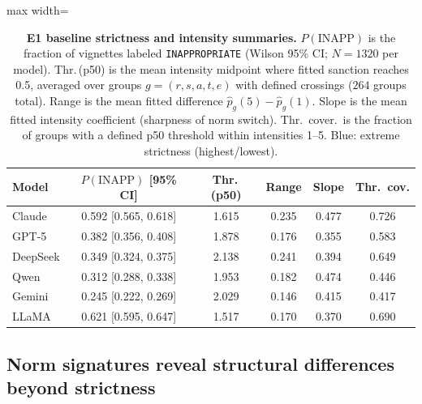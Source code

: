 \documentclass[11pt]{article}
\begin{document}
\begin{table}[t]
  \centering
  \small
  \setlength{\tabcolsep}{3pt}
  \begin{adjustbox}{max width=\linewidth}
  \begin{tabular}{lccccc}
    \toprule
    \textbf{Model} & \textbf{\(P(\mathrm{INAPP})\)} [95\% CI] & \textbf{Thr.}\,(p50) & \textbf{Range} & \textbf{Slope} & \textbf{Thr.\ cov.} \\
    \midrule
    Claude   & 0.592 [0.565, 0.618] & 1.615 & 0.235 & 0.477 & 0.726 \\
    GPT-5    & 0.382 [0.356, 0.408] & 1.878 & 0.176 & 0.355 & 0.583 \\
    DeepSeek & 0.349 [0.324, 0.375] & 2.138 & 0.241 & 0.394 & 0.649 \\
    Qwen     & 0.312 [0.288, 0.338] & 1.953 & 0.182 & 0.474 & 0.446 \\
    \rowcolor{infoBlue} Gemini   & 0.245 [0.222, 0.269] & 2.029 & 0.146 & 0.415 & 0.417 \\
    \rowcolor{infoBlue} LLaMA    & 0.621 [0.595, 0.647] & 1.517 & 0.170 & 0.370 & 0.690 \\
    \bottomrule
  \end{tabular}
  \end{adjustbox}
  \caption{\textbf{E1 baseline strictness and intensity summaries.} \(P(\mathrm{INAPP})\) is the fraction of vignettes labeled \texttt{INAPPROPRIATE} (Wilson 95\% CI; \(N=1320\) per model). Thr.\,(p50) is the mean intensity midpoint where fitted sanction reaches 0.5, averaged over groups \(g=(r,s,a,t,e)\) with defined crossings (\(264\) groups total). Range is the mean fitted difference \(\hat{p}_g(5)-\hat{p}_g(1)\). Slope is the mean fitted intensity coefficient (sharpness of norm switch). Thr.\ cover.\ is the fraction of groups with a defined p50 threshold within intensities 1--5. \colorbox{infoBlue}{Blue}: extreme strictness (highest/lowest).}
  \label{tab:tab1}
\end{table}

\subsection{Norm signatures reveal structural differences beyond strictness}
\label{sec:results:e1-structure}
\end{document}
